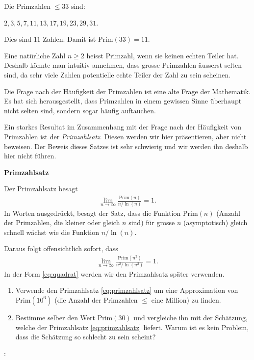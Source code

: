 \begin{Answer}

Die Primzahlen $\leq 33$ sind:

$2, 3, 5, 7, 11, 13, 17, 19, 23, 29, 31$.

Dies sind $11$ Zahlen. Damit ist $\text{Prim}(33) = 11$.
\end{Answer}



Eine natürliche Zahl $n\geq 2$ heisst Primzahl, wenn sie keinen echten Teiler hat. Deshalb könnte man intuitiv annehmen, dass grosse Primzahlen äusserst selten sind, da sehr viele Zahlen potentielle echte Teiler der Zahl zu sein scheinen.

Die Frage nach der Häufigkeit der Primzahlen ist eine alte Frage der Mathematik. Es hat sich herausgestellt, dass Primzahlen in einem gewissen Sinne überhaupt nicht selten sind, sondern sogar häufig auftauchen.

Ein starkes Resultat im Zusammenhang mit der Frage nach der Häufigkeit von Primzahlen ist der \textit{Primzahlsatz}. Diesen werden wir hier präsentieren, aber nicht beweisen. Der Beweis dieses Satzes ist sehr schwierig und wir werden ihn deshalb hier nicht führen.

\textbf{Primzahlsatz}

Der Primzahlsatz besagt
\begin{align}\label{eq:primzahlsatz}
    \lim_{n\to\infty} \frac{\text{Prim}(n)}{n/\ln (n)} = 1.
\end{align}
In Worten ausgedrückt, besagt der Satz, dass die Funktion $\text{Prim}(n)$ (Anzahl der Primzahlen, die kleiner oder gleich $n$ sind) für grosse $n$ (asymptotisch) gleich schnell wächst wie die Funktion $n/\ln (n)$.

Daraus folgt offensichtlich sofort, dass
\begin{align}\label{eq:quadrat}
    \lim_{n\to\infty} \frac{\text{Prim}(n^2)}{n^2/\ln (n^2)} = 1.
\end{align}
In der Form \ref{eq:quadrat} werden wir den Primzahlsatz später verwenden.
\begin{Exercise}
\begin{enumerate}[label=(\alph*)]
    \item Verwende den Primzahlsatz \ref{eq:primzahlsatz} um eine Approximation von $\text{Prim}(10^6)$ (die Anzahl der Primzahlen $\leq$ eine Million) zu finden.
    \item Bestimme selber den Wert $\text{Prim}(30)$ und vergleiche ihn mit der Schätzung, welche der Primzahlsatz \ref{eq:primzahlsatz} liefert. Warum ist es kein Problem, dass die Schätzung so schlecht zu sein scheint?
\end{enumerate}
\end{Exercise}:

